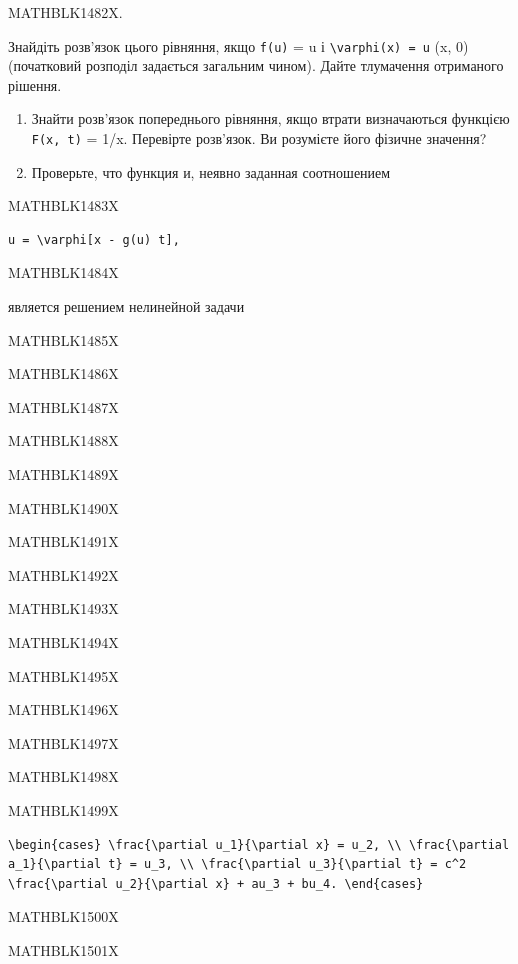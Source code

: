 \documentclass[
  ukrainian,
]{article}
\begin{document}
MATHBLK1482X.

Знайдіть розв'язок цього рівняння, якщо \texttt{f(u)} = u і
\texttt{\textbackslash{}varphi(x)\ =\ u} (x, 0) (початковий розподіл
задається загальним чином). Дайте тлумачення отриманого рішення.

\begin{enumerate}
\def\labelenumi{\arabic{enumi}.}
\setcounter{enumi}{3}
\item
  Знайти розв'язок попереднього рівняння, якщо втрати визначаються
  функцією \texttt{F(x,\ t)} = 1/x. Перевірте розв'язок. Ви розумієте
  його фізичне значення?
\item
  Проверьте, что функция и, неявно заданная соотношением
\end{enumerate}

MATHBLK1483X

\begin{verbatim}
u = \varphi[x - g(u) t],
\end{verbatim}

MATHBLK1484X

является решением нелинейной задачи

MATHBLK1485X

MATHBLK1486X

MATHBLK1487X

MATHBLK1488X

MATHBLK1489X

MATHBLK1490X

MATHBLK1491X

MATHBLK1492X

MATHBLK1493X

MATHBLK1494X

MATHBLK1495X

MATHBLK1496X

MATHBLK1497X

MATHBLK1498X

MATHBLK1499X

\begin{verbatim}
\begin{cases} \frac{\partial u_1}{\partial x} = u_2, \\ \frac{\partial a_1}{\partial t} = u_3, \\ \frac{\partial u_3}{\partial t} = c^2 \frac{\partial u_2}{\partial x} + au_3 + bu_4. \end{cases}
\end{verbatim}

MATHBLK1500X

MATHBLK1501X
\end{document}
